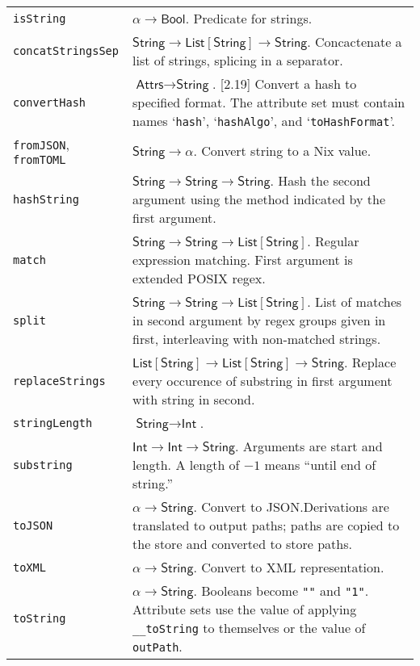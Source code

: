 \documentclass[9pt, a4paper, landscape]{extarticle}
\newcommand{\cmd}[1]{\texttt{#1}}
\newcommand{\str}{\textsf{String}}
\newcommand{\itg}{\textsf{Int}} %
\newcommand{\lst}{\textsf{List}}
\newcommand{\ats}{\textsf{Attrs}}
\newcommand{\bln}{\textsf{Bool}}
\begin{document}
\begin{multicols*}{3}
\begin{tabularx}{\columnwidth}{@{}l>{\raggedright\arraybackslash}X@{}}
  \cmd{isString} & $\alpha\to\bln$. Predicate for strings. \\

  
  \cmd{concatStringsSep} & $\str\to\lst[\str]\to\str$. Concactenate a list
  of strings, splicing in a separator. \\

  \cmd{convertHash} & $\ats\to\str$. [2.19] Convert a hash to specified
  format. The attribute set must contain names `\cmd{hash}',
  `\cmd{hashAlgo}', and `\cmd{toHashFormat}'. \\

  \cmd{fromJSON}, \cmd{fromTOML} & $\str\to\alpha$. Convert string to a Nix
  value. \\

  \cmd{hashString} & $\str\to\str\to\str$. Hash the second argument using
  the method indicated by the first argument. \\
  
  \cmd{match} & $\str\to\str\to\lst[\str]$. Regular expression
  matching. First argument is extended POSIX regex. \\
  
  \cmd{split} & $\str\to\str\to\lst[\str]$. List of matches in second
  argument by regex groups given in first, interleaving with
  non-matched strings. \\
    
  \cmd{replaceStrings} & $\lst[\str]\to\lst[\str]\to\str$. Replace every
  occurence of substring in first argument with string in second. \\

  \cmd{stringLength} & $\str\to\itg$. \\

  \cmd{substring} & $\itg\to\itg\to\str$. Arguments are start and
  length. A length of $-1$ means ``until end of string.'' \\

  \cmd{toJSON} & $\alpha\to\str$. Convert to JSON.\@ Derivations are translated
  to output paths; paths are copied to the store and converted to
  store paths. \\
  
  \cmd{toXML} & $\alpha\to\str$. Convert to XML representation. \\

  \cmd{toString} & $\alpha\to\str$. Booleans become \cmd{""} and
  \cmd{"1"}. Attribute sets use the value of applying
  \cmd{\_\_toString} to themselves or the value of \cmd{outPath}. \\


\end{tabularx}
\end{multicols*}
\end{document}
